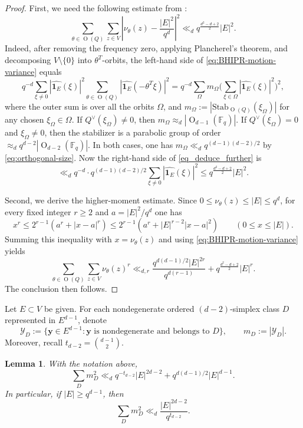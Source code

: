 \documentclass[11pt]{article}
\newtheorem{lemma}[theorem]{Lemma}
\theoremstyle{remark}
\newcommand{\wh}{\widehat}
\numberwithin{equation}{section}
\newcommand{\Fq}{\mathbb F_q}
\newcommand{\cY}{\mathcal Y}
\newcommand{\Orth}{\operatorname O}
\newcommand{\1}{\mathbf 1}
\begin{document}
\begin{proof}
First, we need the following estimate from \cite[(2.5)--(2.6)]{BHIPR}:
\begin{equation} \label{eq:BHIPR-motion-variance}
\sum_{\theta\in\Orth(Q)}\sum_{z\in V}
\left|\nu_\theta(z)-\frac{|E|^2}{q^d}\right|^2
\ll_d q^{\frac{d^2-d+2}{2}} |E|^2.
\end{equation}
Indeed, after removing the frequency zero, applying Plancherel's theorem, and decomposing $V\setminus\{0\}$ into $\theta^T$-orbits, the left-hand side of \eqref{eq:BHIPR-motion-variance} equals 
\begin{equation} \label{eq_deduce_further}
q^{-d}\sum\limits_{\xi\neq 0}|\wh{\1_E}(\xi)|^2\sum\limits_{\theta\in \Orth(Q)}|\wh{\1_E}(-\theta^T\xi)|^2 = q^{-d}\sum\limits_{\Omega}m_\Omega \Bigg(\sum\limits_{\xi\in \Omega}|\wh{\1_E}(\xi)|^2\Bigg)^2,
\end{equation}
where the outer sum is over all the orbits $\Omega$, and $m_\Omega:=|\text{Stab}_{\Orth(Q)}(\xi_\Omega)|$ for any chosen $\xi_\Omega\in \Omega$. If $Q^\vee(\xi_\Omega)\neq 0$, then $m_\Omega\approx_d |\Orth_{d-1}(\Fq)|$. If $Q^\vee(\xi_\Omega)= 0$ and $\xi_\Omega\neq 0$, then the stabilizer is a parabolic group of order $\approx_d q^{d-2}|\Orth_{d-2}(\Fq)|$. In both cases, one has $m_\Omega\ll_d q^{(d-1)(d-2)/2}$ by \eqref{eq:orthogonal-size}. Now the right-hand side of \eqref{eq_deduce_further} is 
\[
\ll_d q^{-d}\cdot q^{(d-1)(d-2)/2} \sum\limits_{\xi\neq 0}|\wh{\1_E}(\xi)|^2 \leq q^{\frac{d^2-d+2}{2}} |E|^2.
\]

Second, we derive the higher-moment estimate. Since \(0\leq\nu_\theta(z)\leq|E|\leq q^d\), for every fixed integer \(r\geq2\) and \(a=|E|^2/q^d\) one has
\[
x^r\leq 2^{r-1}(a^r+ |x-a|^r)\leq 2^{r-1}(a^r+|E|^{r-2}|x-a|^2)
\qquad (0\leq x \leq |E|).
\]
Summing this inequality with \(x=\nu_\theta(z)\) and using \eqref{eq:BHIPR-motion-variance} yields
\[
\sum_{\theta\in\Orth(Q)}\sum_{z\in V}\nu_\theta(z)^r
\ll_{d,r}
\frac{q^{d(d-1)/2}|E|^{2r}}{q^{d(r-1)}}
+
q^{\frac{d^2-d+2}{2}} |E|^r.
\]
The conclusion then follows.
\end{proof}

Let $E\subset V$ be given. For each nondegenerate ordered $(d-2)$-simplex class \(D\) represented in \(E^{d-1}\), denote
\[
\cY_D:=
 \{\mathbf y\in E^{d-1}:
   \mathbf y\text{ is nondegenerate and belongs to \(D\)}\},
 \qquad
 m_D:=|\cY_D|.
\]
Moreover, recall \(t_{d-2}=\binom{d-1}{2}\). 


\begin{lemma} \label{lem:base-second-moment}
With the notation above,  \begin{equation}\label{eq:base-second-moment} \sum_Dm_D^2 \ll_d q^{-t_{d-2}}|E|^{2d-2} + q^{d(d-1)/2}|E|^{d-1}.
\end{equation}
In particular, if \(|E|\ge q^{d-1}\), then
\[
\sum_Dm_D^2 \ll_d  \frac{|E|^{2d-2}}{q^{t_{d-2}}}.
\]
\end{lemma}
\end{document}
